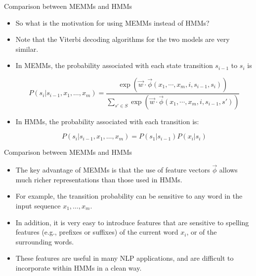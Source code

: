 \documentclass[handout]{beamer}
\begin{document}
\begin{frame}{Comparison between MEMMs and HMMs}
\begin{scriptsize}

\begin{itemize}

\item  So what is the motivation for using MEMMs instead of HMMs?

\item Note that the Viterbi decoding algorithms for the two models are very similar. 

\item In MEMMs, the probability associated with each state transition $s_{i-1}$ to $s_i$ is

 \begin{displaymath}
 P(s_i | s_{i-1}, x_1, \dots, x_m)  =  \frac{\exp (\vec{w}\cdot \vec{\phi}(x_1, \cdots, x_m, i, s_{i-1},s_i))}{\sum_{s' \in S} \exp (\vec{w}\cdot \vec{\phi}(x_1, \cdots, x_m, i, s_{i-1},s'))}
\end{displaymath}


\item In HMMs, the probability associated with each transition is:

\begin{displaymath}
 P(s_i | s_{i-1}, x_1, \dots, x_m) = P(s_1|s_{i-1})P(x_i|s_i)
\end{displaymath}

\end{itemize}

\end{scriptsize}
\end{frame}



\begin{frame}{Comparison between MEMMs and HMMs}
\begin{scriptsize}

\begin{itemize}

\item  The key advantage of MEMMs is that the use of feature vectors $\vec{\phi}$ allows much
richer representations than those used in HMMs.

\item For example, the transition probability can be sensitive to any word in the input sequence $x_1, \dots, x_m$.

\item In addition, it is very easy to introduce features that are sensitive to spelling features (e.g., prefixes or suffixes) of the current word $x_i$, or of the surrounding words.

\item These features are useful in many NLP applications, and are difficult to incorporate within HMMs in a clean way.

\end{itemize}

\end{scriptsize}
\end{frame}
\end{document}
